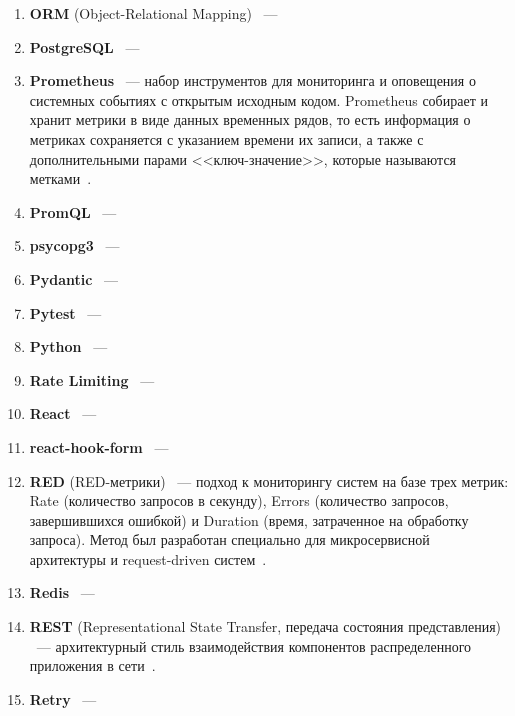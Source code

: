 \begin{enumerate}
    \item \textbf{ORM} (Object-Relational Mapping) ~--- 
    
    \item \textbf{PostgreSQL} ~--- 
    
    \item \textbf{Prometheus} ~--- набор инструментов для мониторинга и оповещения о системных событиях с открытым исходным кодом. 
    Prometheus собирает и хранит метрики в виде данных временных рядов, то есть информация о метриках сохраняется с указанием времени их записи, а также с дополнительными парами <<ключ-значение>>, которые называются метками~\cite{prometheus_official}. 
    
    \item \textbf{PromQL} ~--- 
    
    \item \textbf{psycopg3} ~--- 
    
    \item \textbf{Pydantic} ~--- 
    
    \item \textbf{Pytest} ~--- 
    
    \item \textbf{Python} ~--- 
    
    \item \textbf{Rate Limiting} ~--- 
    
    \item \textbf{React} ~--- 
    
    \item \textbf{react-hook-form} ~--- 
    
    \item \textbf{RED} (RED-метрики) ~--- подход к мониторингу систем на базе трех метрик: Rate (количество запросов в секунду), Errors (количество запросов, завершившихся ошибкой) и Duration (время, затраченное на обработку запроса). 
    Метод был разработан специально для микросервисной архитектуры и request-driven систем~\cite{red_def}. 
    
    \item \textbf{Redis} ~--- 
    
    \item \textbf{REST} (Representational State Transfer, передача состояния представления) ~--- архитектурный стиль взаимодействия компонентов распределенного приложения в сети~\cite{rest_api_def}.  
    
    \item \textbf{Retry} ~--- 
    

\end{enumerate}

